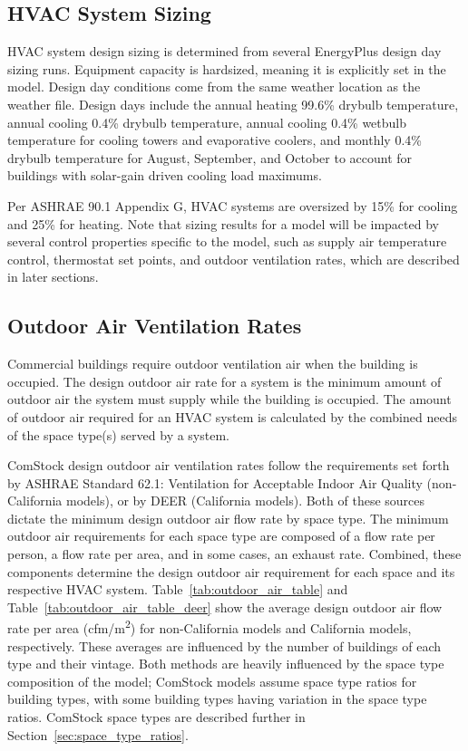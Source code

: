 
\subsection{HVAC System Sizing}

HVAC system design sizing is determined from several EnergyPlus design day sizing runs. Equipment capacity is hardsized, meaning it is explicitly set in the model. Design day conditions come from the same weather location as the weather file. Design days include the annual heating 99.6\% drybulb temperature, annual cooling 0.4\% drybulb temperature, annual cooling 0.4\% wetbulb temperature for cooling towers and evaporative coolers, and monthly 0.4\% drybulb temperature for August, September, and October to account for buildings with solar-gain driven cooling load maximums.

Per ASHRAE 90.1 Appendix G, HVAC systems are oversized by 15\% for cooling and 25\% for heating. Note that sizing results for a model will be impacted by several control properties specific to the model, such as supply air temperature control, thermostat set points, and outdoor ventilation rates, which are described in later sections.

\subsection{Outdoor Air Ventilation Rates}

Commercial buildings require outdoor ventilation air when the building is occupied. The design outdoor air rate for a system is the minimum amount of outdoor air the system must supply while the building is occupied. The amount of outdoor air required for an HVAC system is calculated by the combined needs of the space type(s) served by a system.

ComStock design outdoor air ventilation rates follow the requirements set forth by ASHRAE Standard 62.1: Ventilation for Acceptable Indoor Air Quality (non-California models), or by DEER (California models). Both of these sources dictate the minimum design outdoor air flow rate by space type. The minimum outdoor air requirements for each space type are composed of a flow rate per person, a flow rate per area, and in some cases, an exhaust rate. Combined, these components determine the design outdoor air requirement for each space and its respective HVAC system. Table~\ref{tab:outdoor_air_table} and Table~\ref{tab:outdoor_air_table_deer} show the average design outdoor air flow rate per area (cfm/m\textsuperscript{2}) for non-California models and California models, respectively. These averages are influenced by the number of buildings of each type and their vintage. Both methods are heavily influenced by the space type composition of the model; ComStock models assume space type ratios for building types, with some building types having variation in the space type ratios. ComStock space types are described further in Section~\ref{sec:space_type_ratios}.

